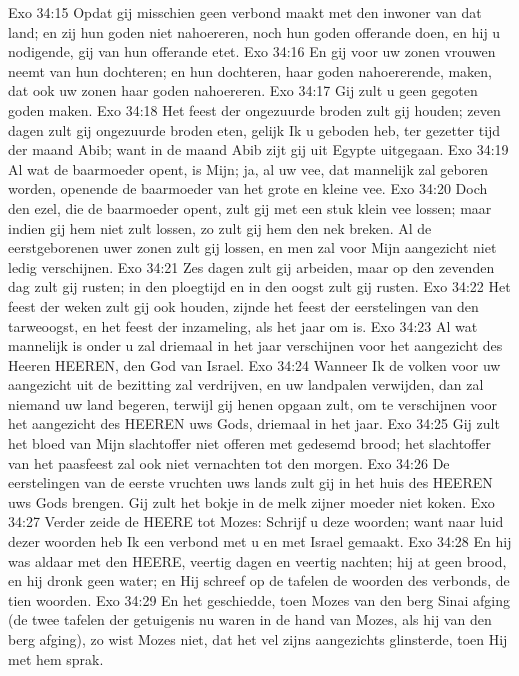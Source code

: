 Exo 34:15  Opdat gij misschien geen verbond maakt met den inwoner van dat land; en zij hun goden niet nahoereren, noch hun goden offerande doen, en hij u nodigende, gij van hun offerande etet.
Exo 34:16  En gij voor uw zonen vrouwen neemt van hun dochteren; en hun dochteren, haar goden nahoererende, maken, dat ook uw zonen haar goden nahoereren.
Exo 34:17  Gij zult u geen gegoten goden maken.
Exo 34:18  Het feest der ongezuurde broden zult gij houden; zeven dagen zult gij ongezuurde broden eten, gelijk Ik u geboden heb, ter gezetter tijd der maand Abib; want in de maand Abib zijt gij uit Egypte uitgegaan.
Exo 34:19  Al wat de baarmoeder opent, is Mijn; ja, al uw vee, dat mannelijk zal geboren worden, openende de baarmoeder van het grote en kleine vee.
Exo 34:20  Doch den ezel, die de baarmoeder opent, zult gij met een stuk klein vee lossen; maar indien gij hem niet zult lossen, zo zult gij hem den nek breken. Al de eerstgeborenen uwer zonen zult gij lossen, en men zal voor Mijn aangezicht niet ledig verschijnen.
Exo 34:21  Zes dagen zult gij arbeiden, maar op den zevenden dag zult gij rusten; in den ploegtijd en in den oogst zult gij rusten.
Exo 34:22  Het feest der weken zult gij ook houden, zijnde het feest der eerstelingen van den tarweoogst, en het feest der inzameling, als het jaar om is.
Exo 34:23  Al wat mannelijk is onder u zal driemaal in het jaar verschijnen voor het aangezicht des Heeren HEEREN, den God van Israel.
Exo 34:24  Wanneer Ik de volken voor uw aangezicht uit de bezitting zal verdrijven, en uw landpalen verwijden, dan zal niemand uw land begeren, terwijl gij henen opgaan zult, om te verschijnen voor het aangezicht des HEEREN uws Gods, driemaal in het jaar.
Exo 34:25  Gij zult het bloed van Mijn slachtoffer niet offeren met gedesemd brood; het slachtoffer van het paasfeest zal ook niet vernachten tot den morgen.
Exo 34:26  De eerstelingen van de eerste vruchten uws lands zult gij in het huis des HEEREN uws Gods brengen. Gij zult het bokje in de melk zijner moeder niet koken.
Exo 34:27  Verder zeide de HEERE tot Mozes: Schrijf u deze woorden; want naar luid dezer woorden heb Ik een verbond met u en met Israel gemaakt.
Exo 34:28  En hij was aldaar met den HEERE, veertig dagen en veertig nachten; hij at geen brood, en hij dronk geen water; en Hij schreef op de tafelen de woorden des verbonds, de tien woorden.
Exo 34:29  En het geschiedde, toen Mozes van den berg Sinai afging (de twee tafelen der getuigenis nu waren in de hand van Mozes, als hij van den berg afging), zo wist Mozes niet, dat het vel zijns aangezichts glinsterde, toen Hij met hem sprak.
